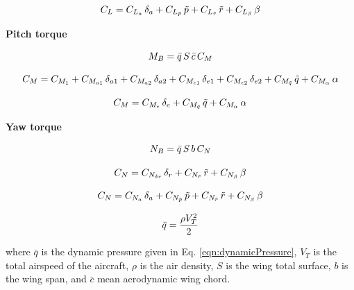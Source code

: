 \begin{equation}{\label{eqn:makoC_L}}
C_L = C_{L_{a}} \, \delta_{a} + C_{L_{\tilde{p}}} \, \tilde{p} + C_{L_{\tilde{r}}} \, \tilde{r} +  C_{L_\beta} \, \beta 
\end{equation}

\textbf{Pitch torque}

\begin{equation}{\label{eqn:pitchTorque}}
M_B = \bar{q} \, S \, \bar{c} \, C_M
\end{equation}

\begin{equation}{\label{eqn:bigCraftC_M}}
C_M = C_{M_{1}} + C_{M_{a1}} \, \delta_{a1} + C_{M_{a2}} \, \delta_{a2} + C_{M_{e1}} \, \delta_{e1} + C_{M_{e2}} \, \delta_{e2} + C_{M_{\tilde{q}}} \, \tilde{q} +  C_{M_\alpha} \, \alpha 
\end{equation}

\begin{equation}{\label{eqn:makoC_M}}
C_M =  C_{M_{e}} \, \delta_{e} + C_{M_{\tilde{q}}} \, \tilde{q} +  C_{M_\alpha} \, \alpha 
\end{equation}

\textbf{Yaw torque}

\begin{equation}{\label{eqn:yawTorque}}
N_B = \bar{q} \, S \, b \, C_N \\
\end{equation}


\begin{equation}{\label{eqn:bigCraftC_N}}
C_N= C_{N_{\delta r}} \, \delta_{r} + C_{N_{\tilde{r}}} \, \tilde{r} +  C_{N_\beta} \, \beta 
\end{equation}

\begin{equation}{\label{eqn:makoC_N}}
C_N= C_{N_{a}} \, \delta_{a} + C_{N_{\tilde{p}}} \, \tilde{p} + C_{N_{\tilde{r}}} \, \tilde{r} +  C_{N_\beta} \, \beta 
\end{equation}

\begin{equation}{\label{eqn:dynamicPressure}}
\bar{q} = \frac{\rho V_T^2}{2} 
\end{equation}

where $\bar{q}$ is the dynamic pressure given in  Eq. \ref{eqn:dynamicPressure}, $V_T$ is the total airspeed of the aircraft, $\rho$ is the air density, $S$ is the wing total surface, $b$ is the wing span, and $\bar{c}$ mean aerodynamic wing chord. 

